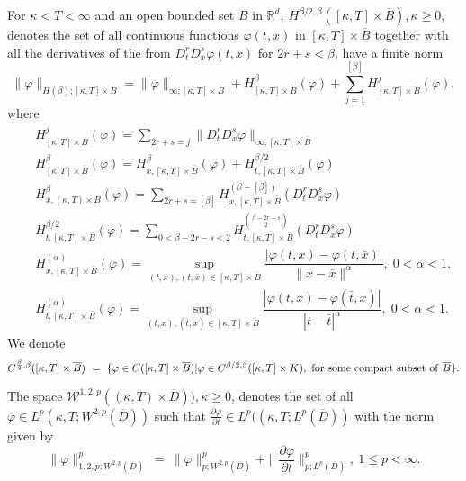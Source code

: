 \documentclass[11pt]{amsart}
\numberwithin{equation}{section}
\begin{document}
For $\kappa < T < \infty$ and an open bounded set  $B$ in $\mathbb{R}^d, \ 
H^{\beta/2, \beta}( [\kappa, T] \times \overline{B}), \kappa \geq 0$,  denotes the set of all
continuous functions $\varphi(t,x)$ in $[\kappa, T] \times \overline{B}$ together with all the derivatives of the from $D^r_tD^s_x\varphi(t,x) $ for $2r+s< \beta$, have a finite norm
$$\|\varphi\|_{H(\beta); [\kappa, T] \times \overline{ B}}
=\| \varphi\|_{\infty ; [\kappa, T] \times \overline{B}}
+H^\beta_{[\kappa, T] \times \overline{B}}(\varphi)
+\sum_{j=1}^{[\beta]}H^j_{[\kappa, T] \times \overline{B}}(\varphi),$$ where
\interdisplaylinepenalty=0
\begin{eqnarray*}
&&H^j_{[\kappa, T] \times \overline{B}}(\varphi)=\sum_{2r+s=j}\| D^r_tD^s_x 
\varphi \|_{\infty ; [\kappa, T] \times \overline{B}} \\
&&H^\beta_{[\kappa, T] \times \overline{B}}(\varphi)=H^\beta_{x, [\kappa, T] \times \overline{B}}(\varphi)
+H^{\beta/2}_{t, [\kappa, T] \times \overline{B}}(\varphi) \\
&&H^\beta_{x,(\kappa, T) \times B}(\varphi)=\sum_{2r+s=[\beta]}
H^{(\beta-[\beta])}_{x, [\kappa, T] \times \overline{B}} (D^r_tD^s_x \varphi ) \\
&&H^{\beta/2}_{t, [\kappa, T] \times \overline{B}}(\varphi)=\sum_{0<\beta-2r-s<2}
H^{(\frac{\beta-2r-s}{2})}_{t, [\kappa, T] \times \overline{B}} (D^r_tD^s_x \varphi ) \\
&&H^{(\alpha)}_{x, [\kappa, T] \times \overline{B}} (\varphi)=\displaystyle{\sup_{(t,x),(t,\bar{x})\in 
[\kappa, T] \times \overline{B}}
\dfrac{|\varphi(t,x)-\varphi(t,\bar{x})|}{\|x-\bar{x}\|^\alpha}}, \; 0<\alpha <1, \\
&&H^{(\alpha)}_{t, [\kappa, T] \times \overline{B}} (\varphi)=\displaystyle{\sup_{(t,x),(\bar{t},x)\in 
[\kappa, T] \times \overline{B}}\dfrac{|\varphi(t,x)-\varphi(\bar{t},x)|}{|t-\bar{t}|^\alpha}}, \; 0<\alpha <1.
\end{eqnarray*}
We denote 
\[
C^{\frac{\beta}{2}, \beta}( [\kappa, T] \times \overline{B}) \ 
= \ \{ \varphi \in C( [\kappa, T] \times \overline{B})
| \varphi \in C^{\beta/2, \beta}( [\kappa, T] \times K), \ {\rm for\ some\ compact\ subset\ of} \ \overline{B}
\} .
\]

The space $\mathcal{W}^{1,2,p}( (\kappa, T) \times \overline{D})), \kappa \geq 0$, denotes the set of all
$\varphi \in L^p ( \kappa, T ; W^{2, p}(\overline{D}))$ such that 
$\frac{\partial \varphi}{\partial t} \in L^p ( (\kappa, T; L^p(\overline{D}))$ with the norm
given by
\[
\|\varphi\|^p_{1,2,p; W^{2, p}(\overline{D})} \ = \ 
\| \varphi \|^p_{p; W^{2,p}(\overline{D})} + \| \frac{\partial \varphi}{\partial t} \|^p_{p; L^p(\overline{D})}
, \ 1 \leq p < \infty.
\]
\end{document}
